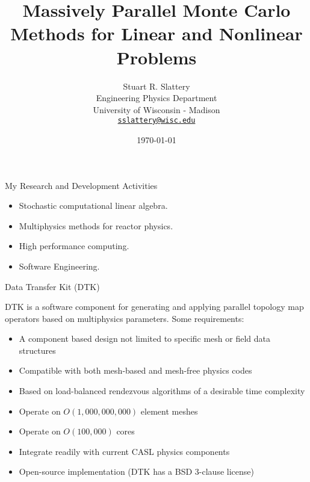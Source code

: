 \documentclass{beamer}
\author{Stuart R. Slattery
  \\ Engineering Physics Department
  \\ University of Wisconsin - Madison
  \\ \href{mailto:sslattery@wisc.edu}{\texttt{sslattery@wisc.edu}}
}
\date{\today}
\title{Massively Parallel Monte Carlo Methods for Linear and Nonlinear
Problems}
\begin{document}
\maketitle


\begin{frame}{My Research and Development Activities}

  \begin{itemize}
  \item Stochastic computational linear algebra.
  \item Multiphysics methods for reactor physics.
  \item High performance computing.
  \item Software Engineering.
  \end{itemize}

\end{frame}

\begin{frame}{Data Transfer Kit (DTK)}

  DTK is a software component for generating and applying parallel
  topology map operators based on multiphysics parameters. Some
  requirements:

  \begin{itemize}
  \item A component based design not limited to specific mesh or
    field data structures
  \item Compatible with both mesh-based and mesh-free physics codes
  \item Based on load-balanced rendezvous algorithms of a desirable
    time complexity
  \item Operate on $O(1,000,000,000)$ element meshes
  \item Operate on $O(100,000)$ cores
  \item Integrate readily with current CASL physics components
  \item Open-source implementation (DTK has a BSD 3-clause license)
  \end{itemize}

\end{frame}
\end{document}
